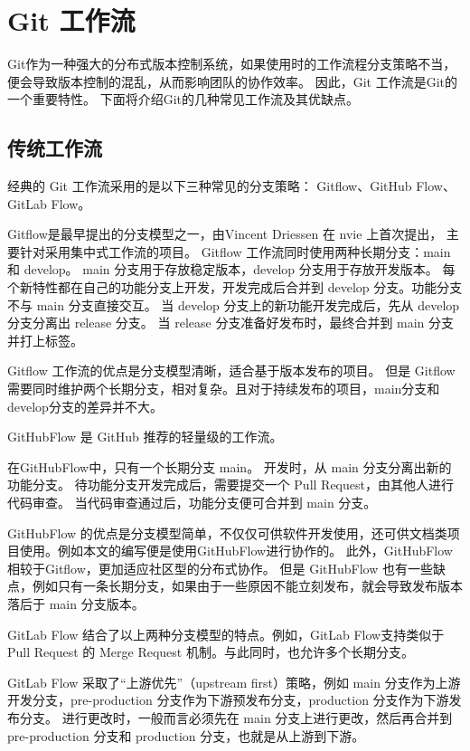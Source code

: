 \documentclass[../main.tex]{subfiles}
\begin{document}
\section{Git 工作流}

Git作为一种强大的分布式版本控制系统，如果使用时的工作流程分支策略不当，便会导致版本控制的混乱，从而影响团队的协作效率。
因此，Git 工作流是Git的一个重要特性。
下面将介绍Git的几种常见工作流及其优缺点。

\subsection{传统工作流}

经典的 Git 工作流采用的是以下三种常见的分支策略：
Gitflow、GitHub Flow、GitLab Flow。

Gitflow是最早提出的分支模型之一，由Vincent Driessen 在 nvie 上首次提出\cite{gitflow}，
主要针对采用集中式工作流的项目。
Gitflow 工作流同时使用两种长期分支：main 和 develop。
main 分支用于存放稳定版本，develop 分支用于存放开发版本。
每个新特性都在自己的功能分支上开发，开发完成后合并到 develop 分支。功能分支不与 main 分支直接交互。
当 develop 分支上的新功能开发完成后，先从 develop 分支分离出 release 分支。
当 release 分支准备好发布时，最终合并到 main 分支并打上标签。

Gitflow 工作流的优点是分支模型清晰，适合基于版本发布的项目。
但是 Gitflow 需要同时维护两个长期分支，相对复杂。且对于持续发布的项目，main分支和develop分支的差异并不大。

GitHubFlow 是 GitHub 推荐的轻量级的工作流\cite{githubflow}。

在GitHubFlow中，只有一个长期分支 main。
开发时，从 main 分支分离出新的功能分支。
待功能分支开发完成后，需要提交一个 Pull Request，由其他人进行代码审查。
当代码审查通过后，功能分支便可合并到 main 分支。

GitHubFlow 的优点是分支模型简单，不仅仅可供软件开发使用，还可供文档类项目使用。例如本文的编写便是使用GitHubFlow进行协作的。
此外，GitHubFlow 相较于Gitflow，更加适应社区型的分布式协作。
但是 GitHubFlow 也有一些缺点，例如只有一条长期分支，如果由于一些原因不能立刻发布，就会导致发布版本落后于 main 分支版本。

GitLab Flow 结合了以上两种分支模型的特点。\cite{gitlabflow}例如，GitLab Flow支持类似于 Pull Request 的 Merge Request 机制。与此同时，也允许多个长期分支。

GitLab Flow 采取了“上游优先”（upstream first）策略，例如 main 分支作为上游开发分支，pre-production 分支作为下游预发布分支，production 分支作为下游发布分支。
进行更改时，一般而言必须先在 main 分支上进行更改，然后再合并到 pre-production 分支和 production 分支，也就是从上游到下游。
\end{document}
